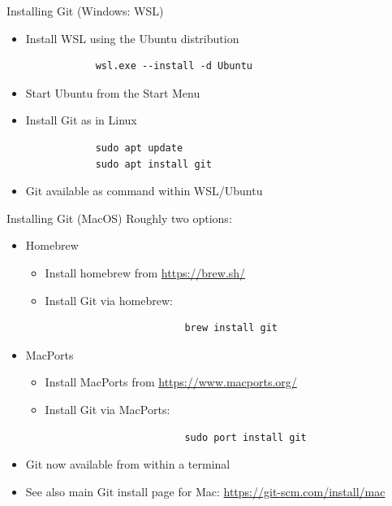 \begin{frame}[fragile]{Installing Git (Windows: WSL)}
    \begin{itemize}
        \item Install WSL using the Ubuntu distribution
            \begin{verbatim}
            wsl.exe --install -d Ubuntu
            \end{verbatim}
        \item Start Ubuntu from the Start Menu
        \item Install Git as in Linux
            \begin{verbatim}
            sudo apt update
            sudo apt install git
            \end{verbatim}
        \item Git available as command within WSL/Ubuntu
    \end{itemize}
\end{frame}

\begin{frame}[fragile]{Installing Git (MacOS)}\label{installing_git_mac}
    Roughly two options:
    \begin{itemize}
        \item Homebrew
            \begin{itemize}
                \item Install homebrew from {\footnotesize \url{https://brew.sh/}}
                \item Install Git via homebrew:
                    \begin{verbatim}
                        brew install git
                    \end{verbatim}
            \end{itemize}
        \item MacPorts
            \begin{itemize}
                \item Install MacPorts from {\footnotesize \url{https://www.macports.org/}}
                \item Install Git via MacPorts:
                    \begin{verbatim}
                        sudo port install git
                    \end{verbatim}
            \end{itemize}
        \item Git now available from within a terminal
        \item See also main Git install page for Mac:
            {\footnotesize \url{https://git-scm.com/install/mac}}
    \end{itemize}
\end{frame}

